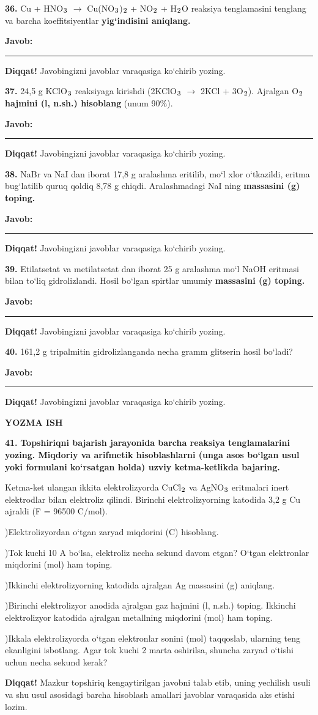 \documentclass[11pt,a4paper]{article}
\renewcommand{\textsubscript}[1]{\ensuremath{_{\text{\fontsize{8}{8}\selectfont #1}}}}
\newcommand{\diqqat}[1]{\par\smallskip\noindent\textbf{Diqqat!} #1\par\medskip}
\newcommand{\javob}{\par\smallskip\noindent\textbf{Javob:} \rule[-2pt]{7.5cm}{0.4pt}\par\smallskip\noindent\textbf{Diqqat!} Javobingizni javoblar varaqasiga ko`chirib yozing.\par\medskip}
\begin{document}
\par\bigskip
\noindent\textbf{36.} Cu + HNO\textsubscript{3} $\to$ Cu(NO\textsubscript{3})\textsubscript{2} + NO\textsubscript{2} + H\textsubscript{2}O reaksiya tenglamasini tenglang va barcha koeffitsiyentlar \textbf{yig`indisini aniqlang.}
\javob
\noindent\textbf{37.} 24,5 g KClO\textsubscript{3} reaksiyaga kirishdi (2KClO\textsubscript{3} $\to$ 2KCl + 3O\textsubscript{2}). Ajralgan O\textsubscript{2} \textbf{hajmini (l, n.sh.) hisoblang} (unum 90\%).
\javob
\noindent\textbf{38.} NaBr va NaI dan iborat 17,8 g aralashma eritilib, mo`l xlor o`tkazildi, eritma bug`latilib quruq qoldiq 8,78 g chiqdi. Aralashmadagi NaI ning \textbf{massasini (g) toping.}
\javob
\noindent\textbf{39.} Etilatsetat va metilatsetat dan iborat 25 g aralashma mo`l NaOH eritmasi bilan to`liq gidrolizlandi. Hosil bo`lgan spirtlar umumiy \textbf{massasini (g) toping.}
\javob
\noindent\textbf{40.} 161,2 g tripalmitin gidrolizlanganda necha gramm glitserin hosil bo`ladi?
\javob
\par\bigskip\begin{center}\textbf{\fontsize{13}{15}\selectfont YOZMA ISH}\end{center}
\noindent\textbf{41.} \textbf{Topshiriqni bajarish jarayonida barcha reaksiya tenglamalarini yozing. Miqdoriy va arifmetik hisoblashlarni (unga asos bo`lgan usul yoki formulani ko`rsatgan holda) uzviy ketma-ketlikda bajaring.}\par\smallskip
Ketma-ket ulangan ikkita elektrolizyorda CuCl\textsubscript{2} va AgNO\textsubscript{3} eritmalari inert elektrodlar bilan elektroliz qilindi. Birinchi elektrolizyorning katodida 3,2 g Cu ajraldi (F = 96500 C/mol).\par
{})Elektrolizyordan o`tgan zaryad miqdorini (C) hisoblang.\par
{})Tok kuchi 10 A bo`lsa, elektroliz necha sekund davom etgan? O`tgan elektronlar miqdorini (mol) ham toping.\par
{})Ikkinchi elektrolizyorning katodida ajralgan Ag massasini (g) aniqlang.\par
{})Birinchi elektrolizyor anodida ajralgan gaz hajmini (l, n.sh.) toping. Ikkinchi elektrolizyor katodida ajralgan metallning miqdorini (mol) ham toping.\par
{})Ikkala elektrolizyorda o`tgan elektronlar sonini (mol) taqqoslab, ularning teng ekanligini isbotlang. Agar tok kuchi 2 marta oshirilsa, shuncha zaryad o`tishi uchun necha sekund kerak?\par
\diqqat{Mazkur topshiriq kengaytirilgan javobni talab etib, uning yechilish usuli va shu usul asosidagi barcha hisoblash amallari javoblar varaqasida aks etishi lozim.}
\end{document}
